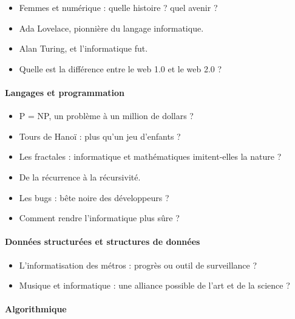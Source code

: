 \documentclass[
  a4paper,
  DIV=11,
  numbers=noendperiod]{scrartcl}
\let\oldparagraph\paragraph
\renewcommand{\paragraph}[1]{\oldparagraph{#1}\mbox{}}
\providecommand{\tightlist}{%
  \setlength{\itemsep}{0pt}\setlength{\parskip}{0pt}}\usepackage{longtable,booktabs,array}
\begin{document}
\begin{itemize}
\tightlist
\item
  Femmes et numérique : quelle histoire ? quel avenir ?
\item
  Ada Lovelace, pionnière du langage informatique.
\item
  Alan Turing, et l'informatique fut.
\item
  Quelle est la différence entre le web 1.0 et le web 2.0 ?
\end{itemize}

\hypertarget{langages-et-programmation}{%
\paragraph{Langages et programmation}\label{langages-et-programmation}}

\begin{itemize}
\tightlist
\item
  P = NP, un problème à un million de dollars ?
\item
  Tours de Hanoï : plus qu'un jeu d'enfants ?
\item
  Les fractales : informatique et mathématiques imitent-elles la nature
  ?
\item
  De la récurrence à la récursivité.
\item
  Les bugs : bête noire des développeurs ?
\item
  Comment rendre l'informatique plus sûre ?
\end{itemize}

\hypertarget{donnuxe9es-structuruxe9es-et-structures-de-donnuxe9es}{%
\paragraph{Données structurées et structures de
données}\label{donnuxe9es-structuruxe9es-et-structures-de-donnuxe9es}}

\begin{itemize}
\tightlist
\item
  L'informatisation des métros : progrès ou outil de surveillance ?
\item
  Musique et informatique : une alliance possible de l'art et de la
  science ?
\end{itemize}

\hypertarget{algorithmique}{%
\paragraph{Algorithmique}\label{algorithmique}}
\end{document}
